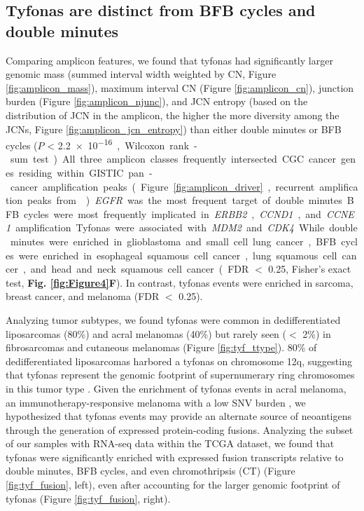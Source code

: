 \documentclass[phd,tocprelim]{cornell}
\begin{document}
\subsection*{Tyfonas are distinct from BFB cycles and double minutes}
Comparing amplicon features, we found that tyfonas had significantly larger genomic mass (summed interval width weighted by CN, Figure \ref{fig:amplicon_mass}), maximum interval CN (Figure \ref{fig:amplicon_cn}), junction burden (Figure \ref{fig:amplicon_njunc}), and JCN entropy (based on the distribution of JCN in the amplicon, the higher the more diversity among the JCNs, Figure \ref{fig:amplicon_jcn_entropy}) than either double minutes or BFB cycles ($P$ < \SI{2.2e-16}, Wilcoxon rank-sum test).  All three amplicon classes frequently intersected CGC cancer genes residing within GISTIC pan-cancer amplification peaks (Figure \ref{fig:amplicon_driver}, recurrent amplification peaks from \cite{Zack:2013f1f}). \textit{EGFR} was the most frequent target of double minutes.  BFB cycles were most frequently implicated in \textit{ERBB2}, \textit{CCND1}, and \textit{CCNE1} amplification. Tyfonas were associated with \textit{MDM2} and \textit{CDK4}. While double minutes were enriched in glioblastoma and small cell lung cancer, BFB cycles were enriched in esophageal squamous cell cancer, lung squamous cell cancer, and head and neck squamous cell cancer (FDR $<$ 0.25, Fisher's exact test, \textbf{Fig. \ref{fig:Figure4}F}). In contrast, tyfonas events were enriched in sarcoma, breast cancer, and melanoma (FDR $<$ 0.25).


Analyzing tumor subtypes, we found tyfonas were common in dedifferentiated liposarcomas (80\%) and acral melanomas (40\%) but rarely seen ($<$ 2\%) in fibrosarcomas and cutaneous melanomas (Figure \ref{fig:tyf_ttype}).    80\% of dedifferentiated liposarcomas harbored a tyfonas on chromosome 12q, suggesting that tyfonas represent the genomic footprint of supernumerary ring chromosomes in this tumor type \cite{Reimann2008-tj}. Given the enrichment of tyfonas events in acral melanoma, an immunotherapy-responsive melanoma with a low SNV burden \cite{Shoushtari2016-de}, we hypothesized that tyfonas events may provide an alternate source of neoantigens through the generation of expressed protein-coding fusions.  Analyzing the subset of our samples with RNA-seq data within the TCGA dataset, we found that tyfonas were significantly enriched with expressed fusion transcripts relative to double minutes, BFB cycles, and even chromothripsis (CT) (Figure \ref{fig:tyf_fusion}, left), even after accounting for the larger genomic footprint of tyfonas (Figure \ref{fig:tyf_fusion}, right).
\end{document}
